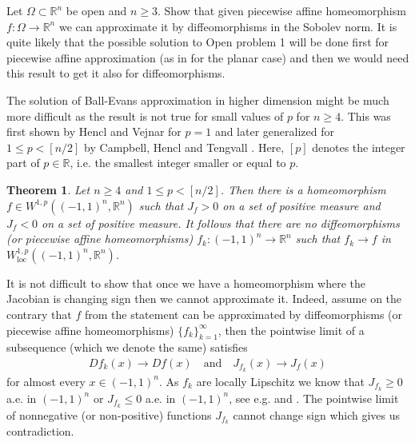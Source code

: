 \documentclass[12pt,a4paper]{amsart}
\theoremstyle{plain}
\newtheorem{thm}{Theorem}[section]
\theoremstyle{definition}
\numberwithin{equation}{section}
\def\er{\mathbb R}
\def\loc{\operatorname{loc}}
\def\rn{\mathbb R^n}
\newcounter{problem}
\begin{document}

 Let $\Omega\subset\rn$ be open and $n\geq 3$. 
Show that given piecewise affine homeomorphism $f:\Omega\to\rn$ we can approximate it by diffeomorphisms in the Sobolev norm. 
It is quite likely that the possible solution to Open problem 1 will be done first for piecewise affine approximation (as in \cite{HP} for the planar case) and then we would need this result to get it also for diffeomorphisms. 

\vskip 10pt

The solution of Ball-Evans approximation in higher dimension might be much more difficult as the result is not true for small values of $p$ for $n\geq 4$. This was first shown by Hencl and Vejnar \cite{HV} for $p=1$ and later generalized for $1 \le p < [n/2]$ by Campbell, Hencl and Tengvall \cite{CHT}. Here, $[p]$ denotes the integer part of $p\in\er$, i.e. the smallest integer smaller or equal to $p$. 

\begin{thm}\label{CrazyMap}
Let $n \ge 4$ and $1 \le p < [n/2]$. Then there is a homeomorphism $f \in W^{1,p}((-1,1)^{n}, \rn)$ such that $J_{f}>0$ on a set of positive measure and $J_{f}<0$ on a set of positive measure. It follows that there are no diffeomorphisms (or piecewise affine homeomorphisms) $f_{k} : (-1,1)^{n} \to \rn$ such that $f_{k} \to f$ in $W_{\loc}^{1,p}((-1,1)^{n}, \rn)$. 
\end{thm}

It is not difficult to show that once we have a homeomorphism where the Jacobian is changing sign then we cannot approximate it. 
Indeed, assume on the contrary that $f$ from the statement can be approximated by diffeomorphisms (or piecewise affine homeomorphisms) $\{ f_{k} \}_{k=1}^{\infty}$, then the pointwise limit of a subsequence (which we denote the same) satisfies 
\begin{align*}
Df_{k}(x) \to Df(x) \quad \text{and} \quad J_{f_{k}}(x) \to J_{f}(x) 
\end{align*}
for almost every $x \in (-1,1)^{n}$. As $f_{k}$ are locally Lipschitz we know that $J_{f_{k}} \ge 0$ a.e. in $(-1,1)^{n}$ or $J_{f_{k}} \le 0$ a.e. in $(-1,1)^{n}$, see e.g. \cite{HM} and \cite[Theorem 5.22]{HK}. The pointwise limit of nonnegative (or non-positive) functions $J_{f_k}$ cannot change sign which gives us contradiction.
\end{document}
